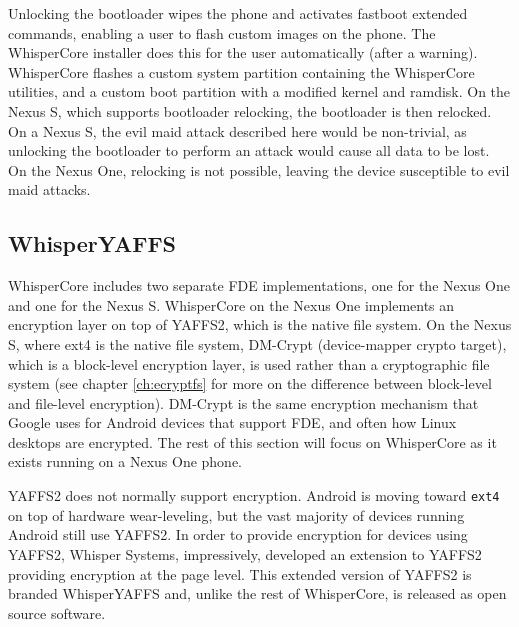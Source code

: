 Unlocking the bootloader wipes the phone and activates fastboot extended commands, enabling a user to flash custom images on the
phone.  The WhisperCore installer does this for the user automatically (after a warning).  WhisperCore flashes a custom system
partition containing the WhisperCore utilities, and a custom boot partition with a modified kernel and ramdisk.  On the Nexus S,
which supports bootloader relocking, the bootloader is then relocked.  On a Nexus S, the evil maid attack described here would be
non-trivial, as unlocking the bootloader to perform an attack would cause all data to be lost.  On the Nexus One, relocking is not
possible, leaving the device susceptible to evil maid attacks. 

\subsection{WhisperYAFFS}
WhisperCore includes two separate FDE implementations, one for the Nexus One and one for the Nexus S. WhisperCore on the Nexus
One implements an encryption layer on top of YAFFS2, which is the native file system.  On the Nexus S, where ext4 is the native
file system, DM-Crypt (device-mapper crypto target), which is a block-level encryption layer, is used rather than a cryptographic
file system (see chapter \ref{ch:ecryptfs} for more on the difference between block-level and file-level encryption).  DM-Crypt is the
same encryption mechanism that Google uses for Android devices that support FDE, and often how Linux desktops are encrypted.  The
rest of this section will focus on WhisperCore as it exists running on a Nexus One phone.

YAFFS2 does not normally support encryption.  Android is moving toward \texttt{ext4} on top of hardware wear-leveling, but the vast
majority of devices running Android still use YAFFS2.  In order to provide encryption for devices using YAFFS2, Whisper Systems,
impressively, developed an extension to YAFFS2 providing encryption at the page level.  This extended version of YAFFS2 is branded
WhisperYAFFS and, unlike the rest of WhisperCore, is released as open source software.

